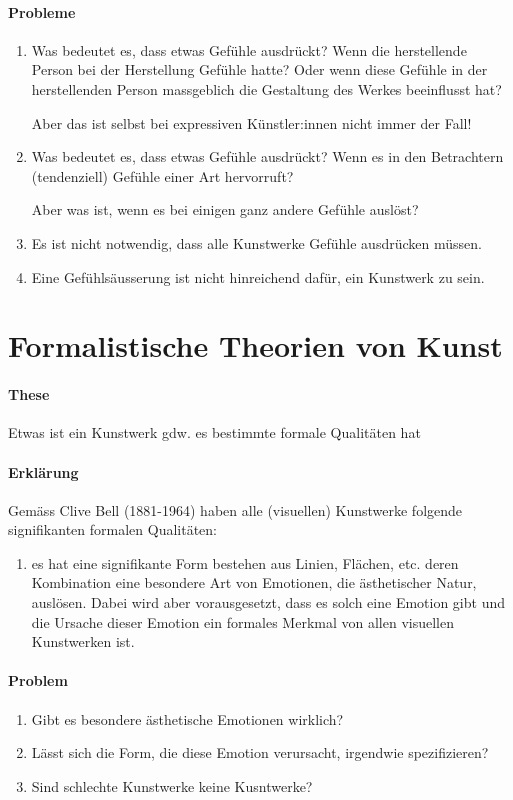 \documentclass[../main.tex]{subfiles}
\begin{document}
\paragraph{Probleme} 
\begin{enumerate}
	\item Was bedeutet es, dass etwas Gefühle ausdrückt? Wenn die herstellende Person bei der Herstellung Gefühle hatte? Oder wenn diese Gefühle in der herstellenden Person massgeblich die Gestaltung des Werkes beeinflusst hat?
	    
	    Aber das ist selbst bei expressiven Künstler:innen nicht immer der Fall!
	\item Was bedeutet es, dass etwas Gefühle ausdrückt? Wenn es in den Betrachtern (tendenziell) Gefühle einer Art hervorruft?
	    
	    Aber was ist, wenn es bei einigen ganz andere Gefühle auslöst?
	\item Es ist nicht notwendig, dass alle Kunstwerke Gefühle ausdrücken müssen.
	\item Eine Gefühlsäusserung ist nicht hinreichend dafür, ein Kunstwerk zu sein.
\end{enumerate}

\section{Formalistische Theorien von Kunst}
\paragraph{These} Etwas ist ein Kunstwerk gdw. es bestimmte formale Qualitäten hat
\paragraph{Erklärung} Gemäss Clive Bell (1881-1964) haben alle (visuellen) Kunstwerke folgende signifikanten formalen Qualitäten:
\begin{enumerate}
	\item es hat eine signifikante Form bestehen aus Linien, Flächen, etc. deren Kombination eine besondere Art von Emotionen, die ästhetischer Natur, auslösen. Dabei wird aber vorausgesetzt, dass es solch eine Emotion gibt und die Ursache dieser Emotion ein formales Merkmal von allen visuellen Kunstwerken ist.
\end{enumerate}
\paragraph{Problem}
\begin{enumerate}
	\item Gibt es besondere ästhetische Emotionen wirklich?
	\item Lässt sich die Form, die diese Emotion verursacht, irgendwie spezifizieren?
	\item Sind schlechte Kunstwerke keine Kusntwerke?
\end{enumerate}
\end{document}
